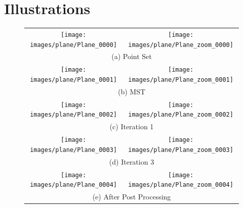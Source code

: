 \documentclass[12pt,a4paper]{article}
\begin{document}
	\section{Illustrations}
	\begin{figure}[H]
		\centering
		\begin{tabular}{c@{\hskip 0in}c}
			\texttt{[image: images/plane/Plane\_0000]} &
			\texttt{[image: images/plane/Plane\_zoom\_0000]} \\
			\multicolumn{2}{c}{(a) Point Set} \\
			\texttt{[image: images/plane/Plane\_0001]} &
			\texttt{[image: images/plane/Plane\_zoom\_0001]} \\
			\multicolumn{2}{c}{(b) MST} \\
			\texttt{[image: images/plane/Plane\_0002]} &
			\texttt{[image: images/plane/Plane\_zoom\_0002]} \\
			\multicolumn{2}{c}{(c) Iteration 1} \\
			\texttt{[image: images/plane/Plane\_0003]} &
			\texttt{[image: images/plane/Plane\_zoom\_0003]} \\
			\multicolumn{2}{c}{(d) Iteration 3} \\
			\texttt{[image: images/plane/Plane\_0004]} &
			\texttt{[image: images/plane/Plane\_zoom\_0004]} \\
			\multicolumn{2}{c}{(e) After Post Processing} \\
		\end{tabular}
	\end{figure}
\end{document}
